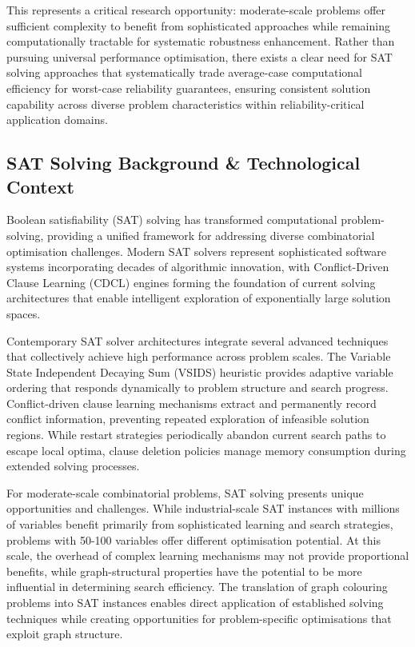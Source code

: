 This represents a critical research opportunity: moderate-scale problems offer sufficient complexity to benefit from sophisticated approaches while remaining computationally tractable for systematic robustness enhancement. Rather than pursuing universal performance optimisation, there exists a clear need for SAT solving approaches that systematically trade average-case computational efficiency for worst-case reliability guarantees, ensuring consistent solution capability across diverse problem characteristics within reliability-critical application domains.


\subsection{SAT Solving Background \& Technological Context}

Boolean satisfiability (SAT) solving has transformed computational problem-solving, providing a unified framework for addressing diverse combinatorial optimisation challenges. Modern SAT solvers represent sophisticated software systems incorporating decades of algorithmic innovation, with Conflict-Driven Clause Learning (CDCL) engines forming the foundation of current solving architectures that enable intelligent exploration of exponentially large solution spaces.

Contemporary SAT solver architectures integrate several advanced techniques that collectively achieve high performance across problem scales. The Variable State Independent Decaying Sum (VSIDS) heuristic provides adaptive variable ordering that responds dynamically to problem structure and search progress. Conflict-driven clause learning mechanisms extract and permanently record conflict information, preventing repeated exploration of infeasible solution regions. While restart strategies periodically abandon current search paths to escape local optima, clause deletion policies manage memory consumption during extended solving processes.

For moderate-scale combinatorial problems, SAT solving presents unique opportunities and challenges. While industrial-scale SAT instances with millions of variables benefit primarily from sophisticated learning and search strategies, problems with 50-100 variables offer different optimisation potential. At this scale, the overhead of complex learning mechanisms may not provide proportional benefits, while graph-structural properties have the potential to be more influential in determining search efficiency. The translation of graph colouring problems into SAT instances enables direct application of established solving techniques while creating opportunities for problem-specific optimisations that exploit graph structure.

